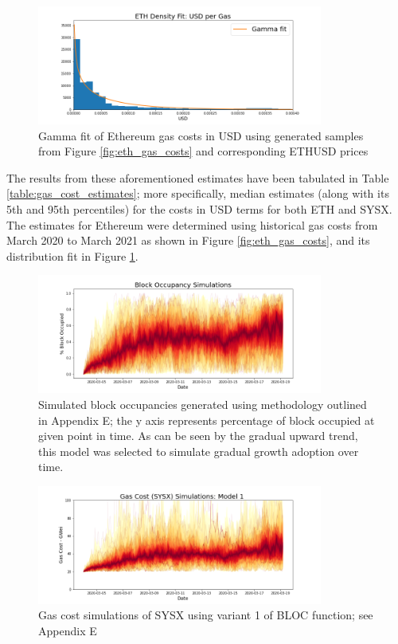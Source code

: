 \documentclass[peerreview]{ieeesyscoin}
\begin{document}
\begin{figure}[h!]
\includegraphics[width=3.7in]{img/eth_usd_density.png}
\caption{Gamma fit of Ethereum gas costs in USD using generated samples from Figure \ref{fig:eth_gas_costs} and corresponding ETHUSD prices} 
\label{fig:eth_usd_density}
\end{figure} 

The results from these aforementioned estimates have been tabulated in Table \ref{table:gas_cost_estimates}; more specifically, median estimates (along with its 5th and 95th percentiles) for the costs in USD terms for both ETH and SYSX. The estimates for Ethereum were determined using historical gas costs from March 2020 to March 2021 as shown in Figure \ref{fig:eth_gas_costs}, and its distribution fit in Figure \ref{fig:eth_usd_density}.

\begin{figure}[h!]
\includegraphics[width=3.7in]{img/blk_occupancy_simulations.png}
\caption{Simulated block occupancies generated using methodology outlined in Appendix E; the y axis represents percentage of block occupied at given point in time. As can be seen by the gradual upward trend, this model was selected to simulate gradual growth adoption over time. } 
\label{fig:blk_occupancy_simulations}
\end{figure} 

\begin{figure}[h!]
\includegraphics[width=3.7in]{img/sysx_gas_costs_m1.png}
\caption{Gas cost simulations of SYSX using variant 1 of BLOC function; see Appendix E} 
\label{fig:sysx_gas_costs_m1}
\end{figure} 
\end{document}
